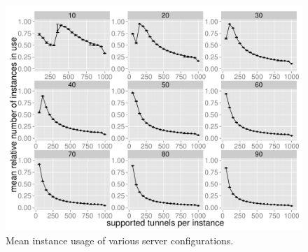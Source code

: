 \begin{figure}[htb]
  \centering
  \includegraphics[width=1.0\textwidth]{images/instanceuse-mean.pdf}
  \caption{Mean instance usage of various server configurations.}
 \label{c4:fig:res-instance-usage-mean}
\end{figure}


